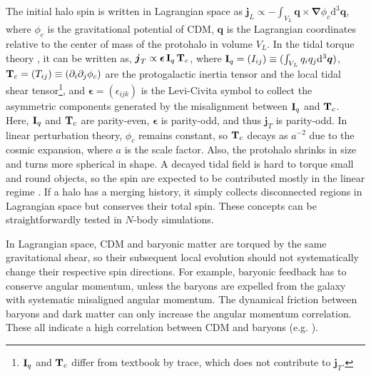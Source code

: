 \documentclass[aps,prd,twocolumn,amsmath,amssymb,amsfont,superscriptaddress,nofootinbib]{revtex4-1}
\newcommand{\bs}{\boldsymbol}
\newcommand{\diff}{{\mathrm d}}
\newcommand{\T}{\bold{T}}
\newcommand{\I}{\bold{I}}
\newcommand{\spin}{\bs{j}}
\begin{document}
The initial halo spin is written in Lagrangian space as 
$\spin_L\propto-\int_{V_L}\bs{q}\times\bs{\nabla}\phi_c\diff^3\bs{q}$, 
where $\phi_c$ is the gravitational potential of CDM, 
$\bs{q}$ is the Lagrangian coordinates relative to the center of mass of the protohalo in volume $V_L$. 
In the tidal torque theory \citep{1984ApJ...286...38W},
it can be written as,
$\spin_T\propto\bs{\epsilon}\,\I_q\,\T_c$, where
$\I_q=(I_{ij})\equiv(\int_{V_L} q_i q_j \diff^3\bs{q})$,
$\T_c=(T_{ij})\equiv(\partial_i\partial_j\phi_c)$
are the protogalactic inertia tensor and the local tidal shear tensor\footnote{$\I_q$ 
and $\T_c$ differ from textbook by trace, which does not contribute to $\spin_T$.}, 
and $\bs{\epsilon}=(\epsilon_{ijk})$ is the Levi-Civita symbol to collect the asymmetric components generated by
the misalignment between $\I_q$ and $\T_c$. Here, $\I_q$ and $\T_c$ are parity-even, $\bs{\epsilon}$ is parity-odd, and thus $\spin_T$ is parity-odd.
In linear perturbation theory, $\phi_c$ remains constant, so $\T_c$ decays as $a^{-2}$ due to the cosmic expansion, where $a$ is the scale factor.
Also, the protohalo shrinks in size and turns more spherical in shape.
A decayed tidal field is hard to torque small and round objects, so the spin are expected to be contributed mostly in the linear regime \citep{2002MNRAS.332..325P}.
If a halo has a merging history, it simply collects disconnected regions in Lagrangian space but conserves their total spin.
These concepts can be straightforwardly tested in $N$-body simulations.

In Lagrangian space, CDM and baryonic matter are torqued by the same gravitational shear, so 
their subsequent local evolution should not systematically change their respective spin directions.
For example, baryonic feedback has to conserve angular momentum, unless the baryons are expelled from the galaxy with systematic misaligned angular momentum.
The dynamical friction between baryons and dark matter can only increase the angular momentum correlation.
These all indicate a high correlation between CDM and baryons (e.g. \citep{2010MNRAS.404.1137B,2010MNRAS.405..274H,2011MNRAS.415.2607D,2015ApJ...812...29T,2018arXiv180407306J}).
 
\end{document}
